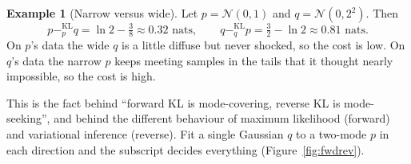 \documentclass[11pt,oneside]{book}
\newcommand{\kl}[1]{\mathbin{-^{\mathrm{KL}}_{#1}}}       %
\theoremstyle{definition}
\newtheorem{example}[definition]{Example}
\theoremstyle{plain}
\theoremstyle{remark}
\begin{document}
\begin{example}[Narrow versus wide]
Let $p=\mathcal N(0,1)$ and $q=\mathcal N(0,2^2)$. Then
\[
p\kl{p}q=\ln2-\tfrac38\approx0.32\text{ nats},\qquad q\kl{q}p=\tfrac32-\ln2\approx0.81\text{ nats}.
\]
On $p$'s data the wide $q$ is a little diffuse but never shocked, so the cost is low. On $q$'s data the narrow $p$ keeps
meeting samples in the tails that it thought nearly impossible, so the cost is high.
\end{example}

This is the fact behind ``forward KL is mode-covering, reverse KL is mode-seeking'', and behind the different
behaviour of maximum likelihood (forward) and variational inference (reverse). Fit a single Gaussian $q$ to a
two-mode $p$ in each direction and the subscript decides everything (Figure~\ref{fig:fwdrev}).
\end{document}
